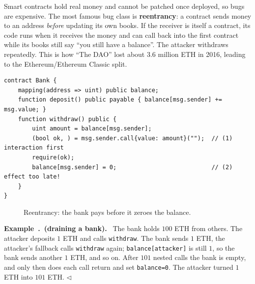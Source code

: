 \documentclass[11pt,a4paper]{article}
\newcounter{exn}[section]
\renewcommand{\theexn}{\thesection.\arabic{exn}}
\newenvironment{plainenglish}{\par\smallskip}{\par\smallskip}
\newenvironment{exbox}[1][]{\par\medskip\refstepcounter{exn}\noindent\textbf{Example~\theexn\if\relax\detokenize{#1}\relax\else\ (#1)\fi.}\ \ignorespaces}{\hfill$\triangleleft$\par\medskip}
\theoremstyle{definition}
\theoremstyle{plain}
\theoremstyle{remark}
\begin{document}
\begin{plainenglish}
Smart contracts hold real money and cannot be patched once deployed, so bugs are expensive. The most famous bug class is \textbf{reentrancy}: a contract sends money to an address \emph{before} updating its own books. If the receiver is itself a contract, its code runs
when it receives the money and can call back into the first contract while its books still say ``you still have a balance''. The attacker withdraws repeatedly. This is how ``The DAO'' lost about 3.6 million ETH in 2016, leading to the Ethereum/Ethereum Classic split.
\end{plainenglish}

\begin{lstlisting}[language=Solidity,caption={A vulnerable bank contract}]
contract Bank {
    mapping(address => uint) public balance;
    function deposit() public payable { balance[msg.sender] += msg.value; }
    function withdraw() public {
        uint amount = balance[msg.sender];
        (bool ok, ) = msg.sender.call{value: amount}("");  // (1) interaction first
        require(ok);
        balance[msg.sender] = 0;                           // (2) effect too late!
    }
}
\end{lstlisting}

\begin{figure}[htbp]
\centering
{}
\caption{Reentrancy: the bank pays before it zeroes the balance.}
\end{figure}

\begin{exbox}[draining a bank]
The bank holds $100$ ETH from others. The attacker deposits $1$ ETH and calls \texttt{withdraw}. The bank sends $1$ ETH, the attacker's fallback calls \texttt{withdraw} again; \texttt{balance[attacker]} is still $1$, so the bank sends another $1$ ETH, and so on.
After $101$ nested calls the bank is empty, and only then does each call return and set \texttt{balance=0}. The attacker turned $1$ ETH into $101$ ETH.
\end{exbox}
\end{document}
